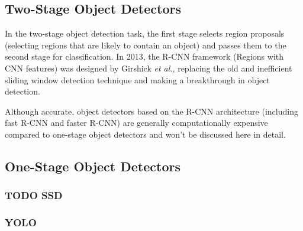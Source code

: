 \subsection{Two-Stage Object Detectors}

In the two-stage object detection task, the first stage selects region proposals
(selecting regions that are likely to contain an object) and passes them to the
second stage for classification. In 2013, the R-CNN framework
\cite{Girshick2013} (Regions with CNN features) was designed by Girshick
\textit{et al.}, replacing the old and inefficient sliding window detection
technique and making a breakthrough in object detection. \cite{Li2022}

Although accurate, object detectors based on the R-CNN architecture (including
fast R-CNN and faster R-CNN) are generally computationally expensive compared to
one-stage object detectors and won't be discussed here in detail.


\subsection{One-Stage Object Detectors}


\subsubsection{TODO SSD}


\subsubsection{YOLO}







